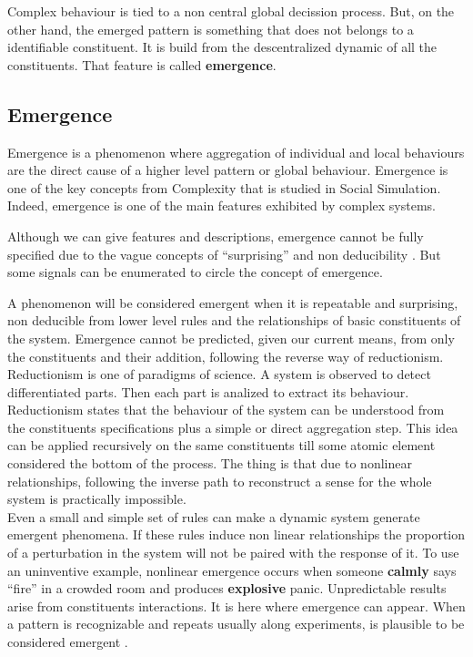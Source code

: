 \documentclass[11pt,oneside,a4paper,openright]{report}
\begin{document}
Complex behaviour is tied to a non central global decission process. But, on the other hand, the emerged pattern is
something that does not belongs to a identifiable constituent. It is build from the descentralized dynamic of all 
the constituents. That feature is called \textbf{emergence}.

\subsection{Emergence}



Emergence is a phenomenon where aggregation of individual and local behaviours are the direct cause
of a higher level pattern or global behaviour. Emergence is one of the key concepts from Complexity 
that is studied in Social Simulation. Indeed, emergence is one of the main features exhibited by 
complex systems.\cite{MillerPage2007}

Although we can give features and descriptions, emergence cannot be fully specified due to the vague 
concepts of ``surprising'' and non deducibility \cite{Holland1997} . But some signals can 
be enumerated to circle the concept of emergence. 

A phenomenon will be considered emergent when it is repeatable and surprising, non deducible from lower 
level rules and the relationships of basic constituents of the system.
Emergence cannot be predicted, given our current means, from only the constituents and their addition, 
following the reverse way of reductionism. Reductionism is one of paradigms of science. A system is observed
to detect differentiated parts. Then each part is analized to extract its behaviour. Reductionism states
that the behaviour of the system can be understood from the constituents specifications plus a simple or 
direct aggregation step. This idea can be applied recursively on the same constituents till some atomic element
considered the bottom of the process. The thing is that due to nonlinear relationships, following the inverse
path to reconstruct a sense for the whole system is practically impossible.\\

Even a small and simple set of rules can make a dynamic system generate emergent phenomena. 
If these rules induce non linear relationships the proportion of a perturbation in the system will not 
be paired with the response of it. To use an uninventive example, nonlinear emergence occurs when someone 
\textbf{calmly} says “fire” in a crowded room and produces \textbf{explosive} panic. Unpredictable results 
arise from constituents interactions. It is here where emergence can appear. When a pattern is recognizable 
and repeats usually along experiments, is plausible to be considered emergent \cite{Holland1997}.\\  
\end{document}
